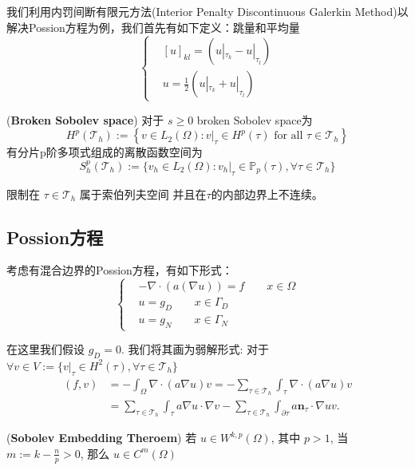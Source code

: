 我们利用内罚间断有限元方法(Interior Penalty Discontinuous Galerkin Method)以解决Possion方程为例，我们首先有如下定义：跳量和平均量
$$\left\{
    \begin{aligned}
        &[u]_{kl}=(u|_{\tau_k}-u|_{\tau_l})\\
        &{u}= \frac{1}{2}(u|_{\tau_k}+u|_{\tau_l})
    \end{aligned}
\right.$$

\begin{definition}
    (\textbf{Broken Sobolev space})
    对于  $s \geq 0$  broken Sobolev space为
    $$H^{p}\left(\mathscr{T}_h\right):=\left\{v \in L_{2}(\Omega): v|_{\tau} \in H^{p}\left(\tau\right) \text { for all } \tau \in \mathscr{T}_h\right\}$$
    有分片p阶多项式组成的离散函数空间为
    $$S^p_h(\mathscr{T}_h):=\{v_h\in L_2(\Omega):v_h|_{\tau}\in\mathbb{P}_p(\tau),\forall \tau \in \mathscr{T}_h\}$$
\end{definition}

限制在 $\tau \in \mathscr{T}_h$ 属于索伯列夫空间 并且在$\tau$的内部边界上不连续。

\subsection{Possion方程}
考虑有混合边界的Possion方程，有如下形式：
$$\left\{\begin{aligned}
    &-\nabla\cdot(a(\nabla u))=f\qquad x \in \Omega\\
    &u=g_D \qquad x\in\Gamma_D\\
    &u=g_N \qquad x\in\Gamma_N
\end{aligned}\right.$$

在这里我们假设 $g_D=0$. 我们将其画为弱解形式: 对于 $\forall v\in V:=\{v|_\tau\in H^2(\tau),\forall \tau\in \mathscr{T}_h\}$
$$\begin{aligned}
(f, v) & =-\int_{\Omega} \nabla \cdot(a \nabla u) v=-\sum_{\tau \in \mathscr{T}_{h}} \int_{\tau} \nabla \cdot(a \nabla u) v \\
& =\sum_{\tau \in \mathscr{T}_{h}} \int_{\tau} a \nabla u \cdot \nabla v-\sum_{\tau \in \mathscr{T}_{h}} \int_{\partial \tau} a \textbf{n}_{\tau}\cdot \nabla u  v .
\end{aligned}$$

\begin{theorem}(\textbf{Sobolev Embedding Theroem})
    若 $u\in W^{k,p}(\Omega)$, 其中 $p>1$, 当 $m:=k-\frac{n}{p}>0$, 那么 $u\in C^{m}(\Omega)$
\end{theorem}


